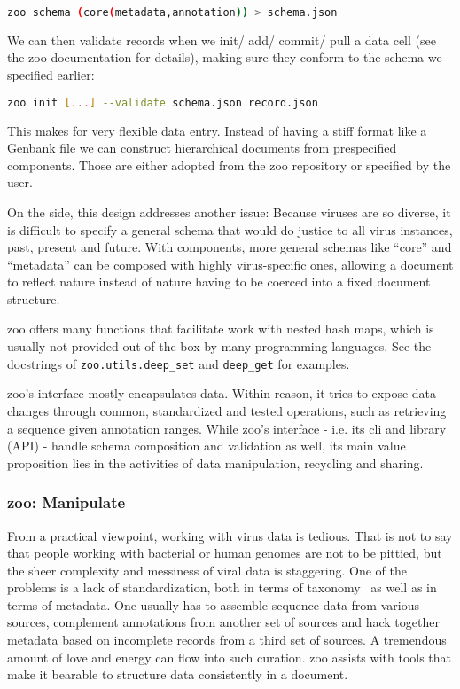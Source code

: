 \begin{lstlisting}[language=bash]
    zoo schema (core(metadata,annotation)) > schema.json
\end{lstlisting}


We can then validate records when we init/ add/ commit/ pull a data cell (see the zoo documentation for details), making sure they conform to the schema we specified earlier:


\begin{lstlisting}[language=bash]
    zoo init [...] --validate schema.json record.json
\end{lstlisting}


This makes for very flexible data entry. Instead of having a stiff format like a Genbank file we can construct hierarchical documents from prespecified components. Those are either adopted from the zoo repository or specified by the user.

On the side, this design addresses another issue: Because viruses are so diverse, it is difficult to specify a general schema that would do justice to all virus instances, past, present and future. With components, more general schemas like ``core'' and ``metadata'' can be composed with highly virus-specific ones, allowing a document to reflect nature instead of nature having to be coerced into a fixed document structure.

zoo offers many functions that facilitate work with nested hash maps, which is usually not provided out-of-the-box by many programming languages. See the docstrings of \colorbox{red-very-light}{\lstinline{zoo.utils.deep_set}} and \colorbox{red-very-light}{\lstinline{deep_get}} for examples.

zoo’s interface mostly encapsulates data. Within reason, it tries to expose data changes through common, standardized and tested operations, such as retrieving a sequence given annotation ranges. While zoo’s interface - i.e. its \gls{cli} and library (API) - handle schema composition and validation as well, its main value proposition lies in the activities of data manipulation, recycling and sharing.


\subsubsection{zoo: Manipulate}

From a practical viewpoint, working with virus data is tedious. That is not to say that people working with bacterial or human genomes are not to be pittied, but the sheer complexity and messiness of viral data is staggering. One of the problems is a lack of standardization, both in terms of taxonomy~\cite{Simmonds2017-sc, Calisher2016-mb, Simmonds2017-wj} as well as in terms of metadata. One usually has to assemble sequence data from various sources, complement annotations from another set of sources and hack together metadata based on incomplete records from a third set of sources. A tremendous amount of love and energy can flow into such curation. zoo assists with tools that make it bearable to structure data consistently in a document.

